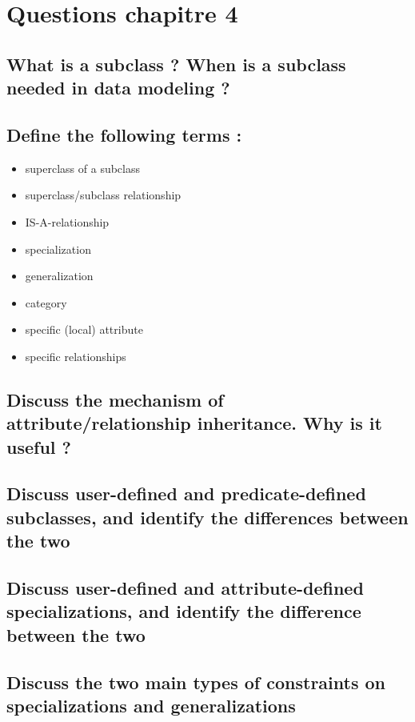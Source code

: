\section{Questions chapitre 4}


\subsection{What is a subclass ? When is a subclass needed in data modeling ?}

\subsection{Define the following terms :}

\begin{itemize}
	\item superclass of a subclass
	\item superclass/subclass relationship
	\item IS-A-relationship
	\item specialization
	\item generalization
	\item category
	\item specific (local) attribute
	\item specific relationships
\end{itemize}

\subsection{Discuss the mechanism of attribute/relationship inheritance. Why is it useful ?}

\subsection{Discuss user-defined and predicate-defined subclasses, and identify the differences between the two}

\subsection{Discuss user-defined and attribute-defined specializations, and identify the difference between the two}

\subsection{Discuss the two main types of constraints on specializations and generalizations}

